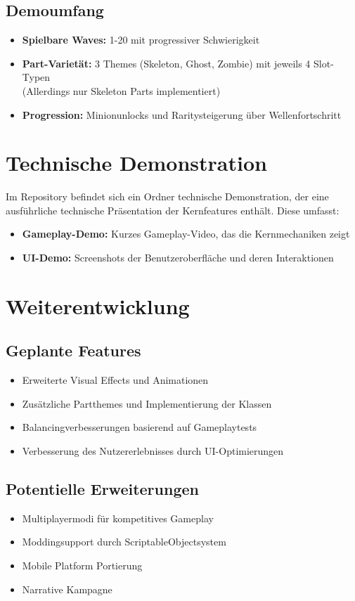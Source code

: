 \subsection{Demoumfang}
\begin{itemize}
    \item \textbf{Spielbare Waves:} 1-20 mit progressiver Schwierigkeit
    \item \textbf{Part-Varietät:} 3 Themes (Skeleton, Ghost, Zombie) mit jeweils 4 Slot-Typen \\
          (Allerdings nur Skeleton Parts implementiert)
    \item \textbf{Progression:} Minionunlocks und Raritysteigerung über Wellenfortschritt
\end{itemize}

\section{Technische Demonstration}

Im Repository befindet sich ein Ordner technische Demonstration, der eine ausführliche 
technische Präsentation der Kernfeatures enthält. Diese umfasst:
\begin{itemize}
    \item \textbf{Gameplay-Demo:} Kurzes Gameplay-Video, das die Kernmechaniken zeigt
    \item \textbf{UI-Demo:} Screenshots der Benutzeroberfläche und deren Interaktionen
\end{itemize}

\section{Weiterentwicklung}

\subsection{Geplante Features}
\begin{itemize}
    \item Erweiterte Visual Effects und Animationen
    \item Zusätzliche Partthemes und Implementierung der Klassen
    \item Balancingverbesserungen basierend auf Gameplaytests
    \item Verbesserung des Nutzererlebnisses durch UI-Optimierungen
\end{itemize}

\subsection{Potentielle Erweiterungen}
\begin{itemize}
    \item Multiplayermodi für kompetitives Gameplay
    \item Moddingsupport durch ScriptableObjectsystem
    \item Mobile Platform Portierung
    \item Narrative Kampagne
\end{itemize}
